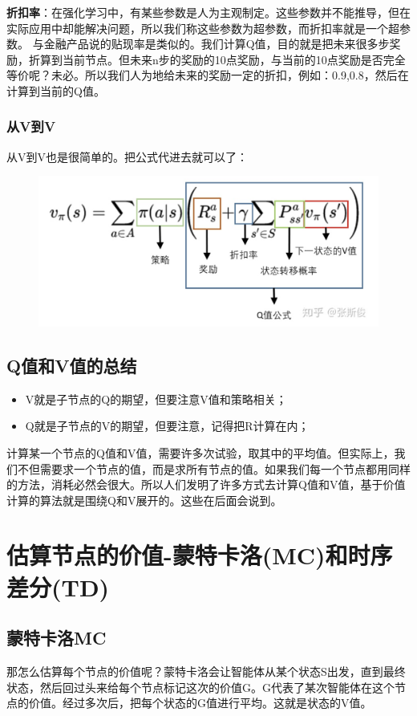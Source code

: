 \documentclass[12pt]{article}
\begin{document}
\begin{framed}
\textbf{折扣率}：在强化学习中，有某些参数是人为主观制定。这些参数并不能推导，但在实际应用中却能解决问题，所以我们称这些参数为超参数，而折扣率就是一个超参数。 与金融产品说的贴现率是类似的。我们计算Q值，目的就是把未来很多步奖励，折算到当前节点。但未来n步的奖励的10点奖励，与当前的10点奖励是否完全等价呢？未必。所以我们人为地给未来的奖励一定的折扣，例如：0.9,0.8，然后在计算到当前的Q值。
\end{framed}

\subsubsection{从V到V}
从V到V也是很简单的。把公式代进去就可以了：
\begin{figure}[H]
    \centering
    \includegraphics[width=.6\textwidth]{fig/ReinforcementLearning/RL_Compute_V_From_V_Eq.png}
\end{figure}

\subsection{Q值和V值的总结}
\begin{itemize}
\setlength{\itemsep}{0pt}
\setlength{\parsep}{0pt}
\setlength{\parskip}{0pt}
    \item V就是子节点的Q的期望，但要注意V值和策略相关；
    \item Q就是子节点的V的期望，但要注意，记得把R计算在内；
\end{itemize}

计算某一个节点的Q值和V值，需要许多次试验，取其中的平均值。但实际上，我们不但需要求一个节点的值，而是求所有节点的值。如果我们每一个节点都用同样的方法，消耗必然会很大。所以人们发明了许多方式去计算Q值和V值，基于价值计算的算法就是围绕Q和V展开的。这些在后面会说到。

\section{估算节点的价值-蒙特卡洛(MC)和时序差分(TD)}
\subsection{蒙特卡洛MC}
那怎么估算每个节点的价值呢？蒙特卡洛会让智能体从某个状态S出发，直到最终状态，然后回过头来给每个节点标记这次的价值G。G代表了某次智能体在这个节点的价值。经过多次后，把每个状态的G值进行平均。这就是状态的V值。
\end{document}
